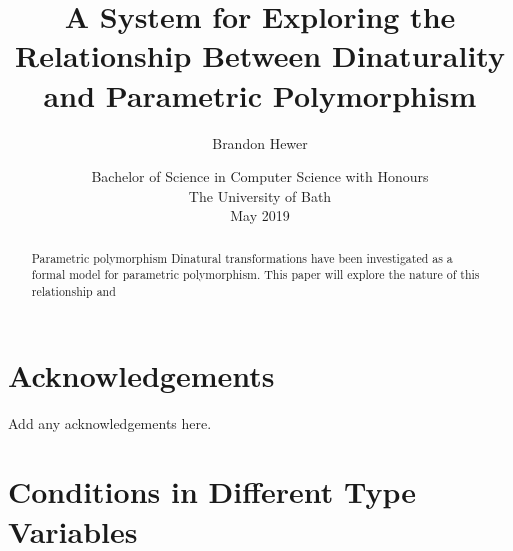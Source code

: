 \documentclass[11pt,openright,hidelinks,a4paper]{article}
\title{A System for Exploring the Relationship Between Dinaturality and Parametric Polymorphism}
\author{Brandon Hewer}
\date{Bachelor of Science in Computer Science with Honours\\The University of Bath\\May 2019}
\begin{document}
\maketitle

\newpage

\newpage


\newpage


\begin{abstract}
Parametric polymorphism  Dinatural transformations have been investigated as a formal model for parametric polymorphism. This paper will explore the nature of this relationship and 
\end{abstract}
\newpage


\tableofcontents
\newpage
\listoffigures

\newpage

\section*{Acknowledgements}
Add any acknowledgements here.
\newpage

\setcounter{page}{1}


\newpage

\newpage

\newpage

\newpage

\newpage

\newpage

\newpage


\newpage



\newpage

\appendix

\section{Conditions in Different Type Variables}\label{app:differentvars}
\end{document}

